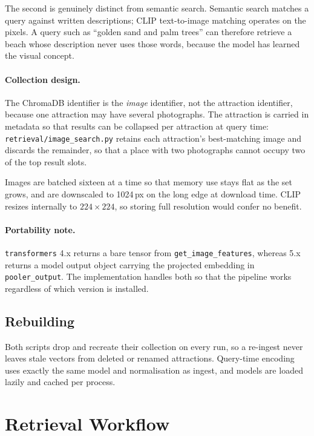 \documentclass[11pt,a4paper]{article}
\begin{document}
The second is genuinely distinct from semantic search. Semantic search matches a
query against written descriptions; CLIP text-to-image matching operates on the
pixels. A query such as ``golden sand and palm trees'' can therefore retrieve a
beach whose description never uses those words, because the model has learned
the visual concept.

\paragraph{Collection design.} The ChromaDB identifier is the \emph{image}
identifier, not the attraction identifier, because one attraction may have
several photographs. The attraction is carried in metadata so that results can
be collapsed per attraction at query time: \texttt{retrieval/image\_search.py}
retains each attraction's best-matching image and discards the remainder, so
that a place with two photographs cannot occupy two of the top result slots.

Images are batched sixteen at a time so that memory use stays flat as the set
grows, and are downscaled to 1024\,px on the long edge at download time. CLIP
resizes internally to $224\times224$, so storing full resolution would confer no
benefit.

\paragraph{Portability note.} \texttt{transformers} 4.x returns a bare tensor
from \texttt{get\_image\_features}, whereas 5.x returns a model output object
carrying the projected embedding in \texttt{pooler\_output}. The implementation
handles both so that the pipeline works regardless of which version is
installed.

\subsection{Rebuilding}

Both scripts drop and recreate their collection on every run, so a re-ingest
never leaves stale vectors from deleted or renamed attractions. Query-time
encoding uses exactly the same model and normalisation as ingest, and models are
loaded lazily and cached per process.

\section{Retrieval Workflow}
\end{document}
